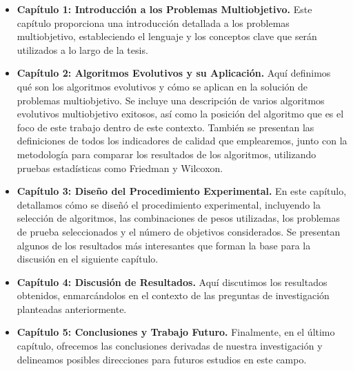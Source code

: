 \begin{itemize}
    \item \textbf{Capítulo 1: Introducción a los Problemas Multiobjetivo.} Este capítulo proporciona una introducción detallada a los problemas multiobjetivo, estableciendo el lenguaje y los conceptos clave que serán utilizados a lo largo de la tesis.
    \item \textbf{Capítulo 2: Algoritmos Evolutivos y su Aplicación.} Aquí definimos qué son los algoritmos evolutivos y cómo se aplican en la solución de problemas multiobjetivo. Se incluye una descripción de varios algoritmos evolutivos multiobjetivo exitosos, así como la posición del algoritmo que es el foco de este trabajo dentro de este contexto. También se presentan las definiciones de todos los indicadores de calidad que emplearemos, junto con la metodología para comparar los resultados de los algoritmos, utilizando pruebas estadísticas como Friedman y Wilcoxon.
    \item \textbf{Capítulo 3: Diseño del Procedimiento Experimental.} En este capítulo, detallamos cómo se diseñó el procedimiento experimental, incluyendo la selección de algoritmos, las combinaciones de pesos utilizadas, los problemas de prueba seleccionados y el número de objetivos considerados. Se presentan algunos de los resultados más interesantes que forman la base para la discusión en el siguiente capítulo.
    \item \textbf{Capítulo 4: Discusión de Resultados.} Aquí discutimos los resultados obtenidos, enmarcándolos en el contexto de las preguntas de investigación planteadas anteriormente.
    \item \textbf{Capítulo 5: Conclusiones y Trabajo Futuro.} Finalmente, en el último capítulo, ofrecemos las conclusiones derivadas de nuestra investigación y delineamos posibles direcciones para futuros estudios en este campo.
\end{itemize}





